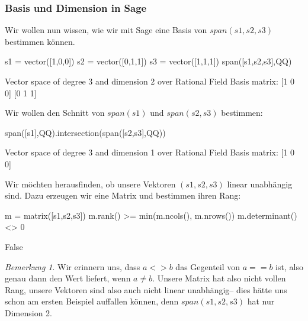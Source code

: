 \documentclass[fontsize=12pt,paper=a4,twoside,bibtotoc,idxtotoc,
liststotoc,pagesize,BCOR1.2cm,DIV15,chapterprefix,pagesize=pdftex]{scrbook}
\theoremstyle{plain}
\theoremstyle{definition}
\theoremstyle{remark}
\newtheorem{bem}[equation]{Bemerkung}
\begin{document}
\subsubsection{Basis und Dimension in Sage}
Wir wollen nun wissen, wie wir mit Sage eine Basis von $span(s1,s2,s3)$ bestimmen können.
\begin{sagein}
s1 = vector([1,0,0])
s2 = vector([0,1,1])
s3 = vector([1,1,1])
span([s1,s2,s3],QQ)
\end{sagein}
\begin{sageout}
Vector space of degree 3 and dimension 2 over Rational Field
Basis matrix:
[1 0 0]
[0 1 1]
\end{sageout}
 Wir wollen den Schnitt von $span(s1)$ und $span(s2,s3)$ bestimmen:
\begin{sagein}
span([s1],QQ).intersection(span([s2,s3],QQ))
\end{sagein}
\begin{sageout}
Vector space of degree 3 and dimension 1 over Rational Field
Basis matrix:
[1 0 0]
\end{sageout}
Wir möchten herausfinden, ob unsere Vektoren $(s1,s2,s3)$ linear unabhängig sind. Dazu erzeugen wir eine Matrix und bestimmen ihren Rang:
\begin{sagein}
m = matrix([s1,s2,s3])
m.rank() >= min(m.ncols(), m.nrows())
m.determinant() <> 0 
\end{sagein}
\begin{sageout}
  False
\end{sageout}
\begin{bem}
 Wir erinnern uns, dass $a <> b$ das Gegenteil von $a == b$ ist, also genau dann den Wert  liefert, wenn $a\not=b$. Unsere Matrix hat also nicht vollen Rang, 
unsere Vektoren sind also auch nicht linear unabhängig-- dies hätte uns schon am ersten Beispiel auffallen können, denn $span(s1,s2,s3)$ hat nur Dimension 2.
\end{bem}
\end{document}
